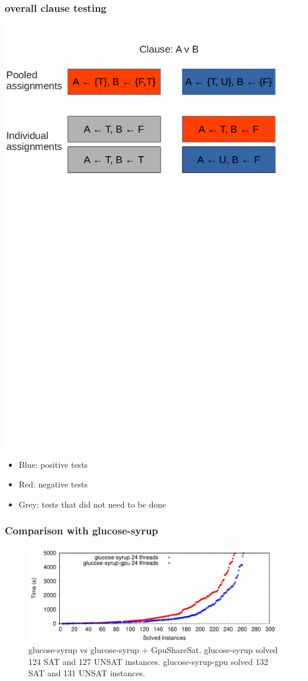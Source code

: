 \documentclass{beamer}
\begin{document}
\begin{frame}
\frametitle{overall clause testing}
\includegraphics[width=\textwidth]{clauseTest.png}
\begin{itemize}
\item Blue: positive tests
\item Red: negative tests
\item Grey: tests that did not need to be done
\end{itemize}
\end{frame}

\begin{frame}
\frametitle{Comparison with glucose-syrup}
\begin{figure}[h]
	\includegraphics[width=\textwidth]{cactusplot_syrup_vs_syrup_gpu}
	\caption{glucose-syrup vs glucose-syrup + GpuShareSat. glucose-syrup solved 124 SAT and 127 UNSAT instances. glucose-syrup-gpu solved 132 SAT and 131 UNSAT instances.  }
	\label{cactus:syrup}
\end{figure}
\end{frame}
\end{document}

